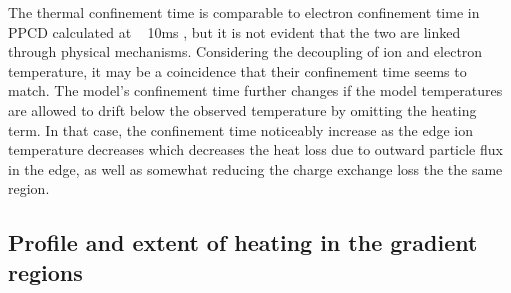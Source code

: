 The thermal confinement time is comparable to electron confinement time in PPCD calculated at ~ 10ms \cite{Chapman2001}, but it is not evident that the two are linked through physical mechanisms. Considering the decoupling of ion and electron temperature, it may be a coincidence that their confinement time seems to match. The model's confinement time further changes if the model temperatures are allowed to drift below the observed temperature by omitting the \adhoc heating term. In that case, the confinement time noticeably increase as the edge ion temperature decreases which decreases the heat loss due to outward particle flux in the edge, as well as somewhat reducing the charge exchange loss the the same region. 

\subsection{Profile and extent of \adhoc heating in the gradient regions}\label{sec:anomalous_heating}

